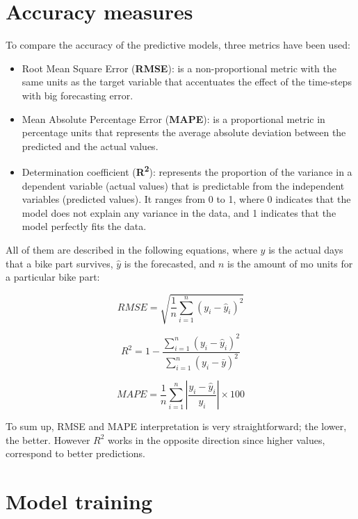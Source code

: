     \clearpage


\section{Accuracy measures}
\label{app_paper3:section_accuracy_measures}
    To compare the accuracy of the predictive models, three metrics have been used:
    \begin{itemize}
    \item Root Mean Square Error (\textbf{RMSE}): is a non-proportional metric with the same units as the target variable that accentuates the effect of the time-steps with big forecasting error.
    \item Mean Absolute Percentage Error (\textbf{MAPE}): is a proportional metric in percentage units that represents the average absolute deviation between the predicted and the actual values.
    \item Determination coefficient (\textbf{R\textsuperscript{2}}): represents the proportion of the variance in a dependent variable (actual values) that is predictable from the independent variables (predicted values). It ranges from 0 to 1, where 0 indicates that the model does not explain any variance in the data, and 1 indicates that the model perfectly fits the data.
    \end{itemize}
    
    All of them are described in the following equations, where $y$ is the actual days that a bike part survives, $\hat{y}$ is the forecasted, and $n$ is the amount of \ac{mo} units for a particular bike part:
    
    
    $$ RMSE = \sqrt{\frac{1}{n}\sum_{i=1}^{n}(y_i - \hat{y}_i)^2} $$
    
    
    $$ R^2 = 1 - \frac{\sum_{i=1}^{n}(y_i - \hat{y}_i)^2}{\sum_{i=1}^{n}(y_i - \bar{y})^2} $$
    
    
    $$ MAPE = \frac{1}{n} \sum_{i=1}^{n} \left| \frac{y_i - \hat{y}_i}{y_i} \right| \times 100 $$
    
    To sum up, RMSE and MAPE interpretation is very straightforward; the lower, the better.  However $R^{2}$ works in the opposite direction since higher values, correspond to better predictions.
    
    \clearpage


\section{Model training}
\label{app_paper3:section_model_training}
\setcounter{figure}{0}
\setcounter{table}{0}
\renewcommand{\thefigure}{C.4.\arabic{figure}}
\renewcommand{\thetable}{C.4.\arabic{table}}

